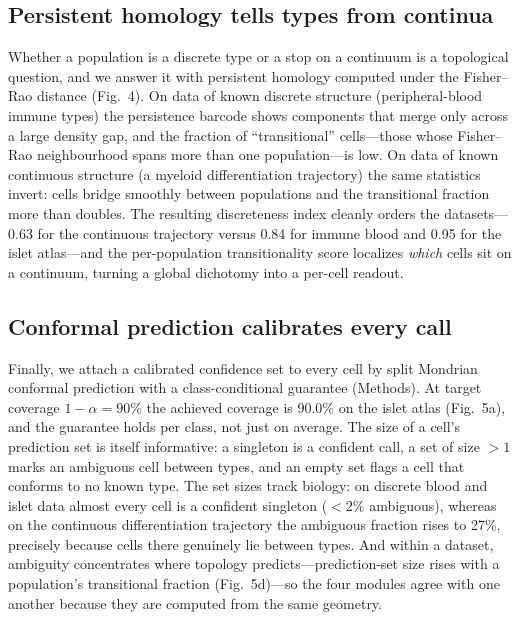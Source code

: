 \documentclass[11pt]{article}
\newcommand{\covnominal}{90}
\newcommand{\covachieved}{90.0} %
\newcommand{\discpbmc}{0.84}    %
\newcommand{\discpanc}{0.95}    %
\newcommand{\disccont}{0.63}    %
\newcommand{\ambcont}{27}       %
\begin{document}
\subsection{Persistent homology tells types from continua}
Whether a population is a discrete type or a stop on a continuum is a topological question, and we
answer it with persistent homology computed under the Fisher--Rao distance (Fig.~4). On data of known
discrete structure (peripheral-blood immune types) the persistence barcode shows components that
merge only across a large density gap, and the fraction of ``transitional'' cells---those whose
Fisher--Rao neighbourhood spans more than one population---is low. On data of known continuous
structure (a myeloid differentiation trajectory) the same statistics invert: cells bridge smoothly
between populations and the transitional fraction more than doubles. The resulting discreteness index
cleanly orders the datasets---\disccont{} for the continuous trajectory versus \discpbmc{} for immune
blood and \discpanc{} for the islet atlas---and the per-population transitionality score localizes
\emph{which} cells sit on a continuum, turning a global dichotomy into a per-cell readout.

\subsection{Conformal prediction calibrates every call}
Finally, we attach a calibrated confidence set to every cell by split Mondrian conformal prediction
with a class-conditional guarantee (Methods). At target coverage $1-\alpha=\covnominal\%$ the achieved
coverage is \covachieved\% on the islet atlas (Fig.~5a), and the guarantee holds per class, not just on
average. The size of a cell's prediction set is itself informative: a singleton is a confident call, a
set of size $>1$ marks an ambiguous cell between types, and an empty set flags a cell that conforms to
no known type. The set sizes track biology: on discrete blood and islet data almost every cell is a
confident singleton ($<2\%$ ambiguous), whereas on the continuous differentiation trajectory the
ambiguous fraction rises to \ambcont\%, precisely because cells there genuinely lie between types. And
within a dataset, ambiguity concentrates where topology predicts---prediction-set size rises with a
population's transitional fraction (Fig.~5d)---so the four modules agree with one another because they
are computed from the same geometry.
\end{document}
